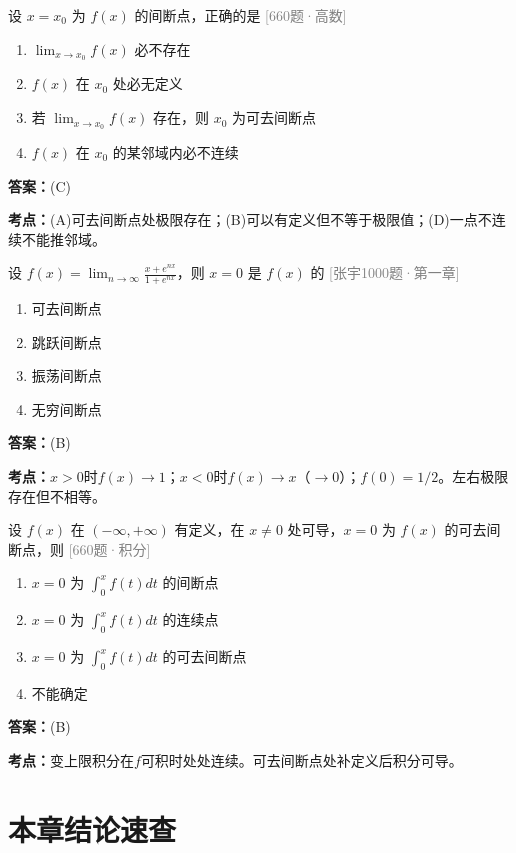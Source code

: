\documentclass[12pt,a4paper]{ctexbook}
\newcommand{\src}[1]{\hfill\textcolor{gray}{\small\textsf{[#1]}}}
\newcommand{\ans}[1]{\begin{answerbox}\textbf{答案：}#1\end{answerbox}}
\newcommand{\kpt}[1]{\textbf{考点：}#1}
\begin{document}
\begin{exercise}[660题·间断点性质]
设 $x=x_0$ 为 $f(x)$ 的间断点，正确的是 \hfill\src{660题·高数}
\begin{enumerate}[label=(\Alph*),nosep]
  \item $\lim_{x\to x_0}f(x)$ 必不存在
  \item $f(x)$ 在 $x_0$ 处必无定义
  \item 若 $\lim_{x\to x_0}f(x)$ 存在，则 $x_0$ 为可去间断点
  \item $f(x)$ 在 $x_0$ 的某邻域内必不连续
\end{enumerate}
\end{exercise}
\ans{(C)}
\kpt{(A)可去间断点处极限存在；(B)可以有定义但不等于极限值；(D)一点不连续不能推邻域。}

\bigskip

\begin{exercise}[张宇1000题·极限函数间断点]
设 $f(x)=\lim_{n\to\infty}\frac{x+e^{nx}}{1+e^{nx}}$，则 $x=0$ 是 $f(x)$ 的 \hfill\src{张宇1000题·第一章}
\begin{enumerate}[label=(\Alph*),nosep]
  \item 可去间断点
  \item 跳跃间断点
  \item 振荡间断点
  \item 无穷间断点
\end{enumerate}
\end{exercise}
\ans{(B)}
\kpt{$x>0$时$f(x)\to 1$；$x<0$时$f(x)\to x$（$\to 0$）；$f(0)=1/2$。左右极限存在但不相等。}

\bigskip

\begin{exercise}[660题·可去间断点与变限积分]
设 $f(x)$ 在 $(-\infty,+\infty)$ 有定义，在 $x\neq 0$ 处可导，$x=0$ 为 $f(x)$ 的可去间断点，则 \hfill\src{660题·积分}
\begin{enumerate}[label=(\Alph*),nosep]
  \item $x=0$ 为 $\int_0^x f(t)dt$ 的间断点
  \item $x=0$ 为 $\int_0^x f(t)dt$ 的连续点
  \item $x=0$ 为 $\int_0^x f(t)dt$ 的可去间断点
  \item 不能确定
\end{enumerate}
\end{exercise}
\ans{(B)}
\kpt{变上限积分在$f$可积时处处连续。可去间断点处补定义后积分可导。}

\section{本章结论速查}
\end{document}
